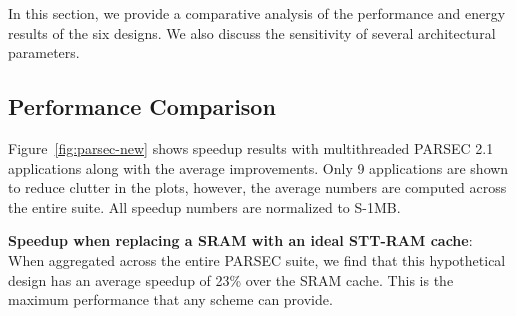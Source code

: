 In this section, we provide a comparative analysis of the performance and energy results of the six designs.
We also discuss the sensitivity of several architectural parameters.




%


\subsection {Performance Comparison}
\begin{figure*} [t]
\centering
 \caption{\label{fig:spec-new} Normalized Average Instruction Throughput(IT) and Weighted Speedup(WS) for SPEC 2K6 multiprogrammed mixes. }
\end{figure*}


\begin{figure*} [t]
\centering
 \caption{\label{fig:parsec-new} Normalized speedup for PARSEC 2.1 applications. }
\end{figure*}


Figure~\ref{fig:parsec-new} shows speedup results with multithreaded PARSEC 2.1
applications along with the average improvements. Only 9 applications are shown to reduce clutter in the plots, however,
the average numbers are computed across the entire suite. All speedup numbers are normalized to S-1MB.

{\bf Speedup when replacing a SRAM with an ideal STT-RAM cache}: When aggregated across the entire PARSEC suite, we find that this hypothetical design has an average speedup of 23\% over the SRAM cache. This is the maximum performance that any scheme can provide.

